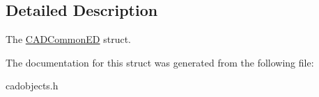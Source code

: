 \subsection{Detailed Description}
The \hyperlink{struct_c_a_d_common_e_d}{C\+A\+D\+Common\+ED} struct. 

The documentation for this struct was generated from the following file\+:\begin{DoxyCompactItemize}
\item 
cadobjects.\+h\end{DoxyCompactItemize}
